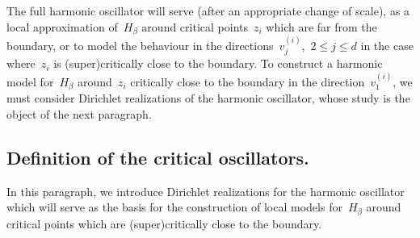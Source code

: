 \documentclass[10pt]{article}
\newcommand{\1}{\mathbbm 1}
\newcommand{\hessEigvec}[2]{v^{(#1)}_{#2}} %
\begin{document}
    The full harmonic oscillator will serve (after an appropriate change of scale), as a local approximation of~$H_\beta$ around critical points~$z_i$ which are far from the boundary, or to model the behaviour in the directions~$\hessEigvec{i}{j}$,~$2\leq j \leq d$ in the case where~$z_i$ is (super)critically close to the boundary.
    To construct a harmonic model for~$H_\beta$ around~$z_i$ critically close to the boundary in the direction~$\hessEigvec{i}{1}$, we must consider Dirichlet realizations of the harmonic oscillator, whose study is the object of the next paragraph.
    \subsection{Definition of the critical oscillators.}\label{subsec:critical_oscillators}
    In this paragraph, we introduce Dirichlet realizations for the harmonic oscillator which will serve as the basis for the construction of local models for~$H_\beta$ around critical points which are (super)critically close to the boundary.
\end{document}
